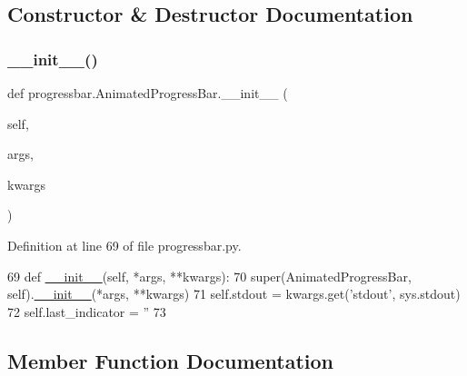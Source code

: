 \subsection{Constructor \& Destructor Documentation}
\mbox{\label{classprogressbar_1_1AnimatedProgressBar_ac5fb173f8610ea6caa27306a60a8903f}} 
\subsubsection{\texorpdfstring{\+\_\+\+\_\+init\+\_\+\+\_\+()}{\_\_init\_\_()}}
{\footnotesize\ttfamily def progressbar.\+Animated\+Progress\+Bar.\+\_\+\+\_\+init\+\_\+\+\_\+ (\begin{DoxyParamCaption}\item[{}]{self,  }\item[{}]{args,  }\item[{}]{kwargs }\end{DoxyParamCaption})}



Definition at line 69 of file progressbar.\+py.


\begin{DoxyCode}
69     \textcolor{keyword}{def }\hyperlink{classwrapper_1_1ModuleDictWrapper_a9a7a794150502f51df687831583e13b9}{\_\_init\_\_}(self, *args, **kwargs):
70         super(AnimatedProgressBar, self).\hyperlink{classwrapper_1_1ModuleDictWrapper_a9a7a794150502f51df687831583e13b9}{\_\_init\_\_}(*args, **kwargs)
71         self.stdout = kwargs.get(\textcolor{stringliteral}{'stdout'}, sys.stdout)
72         self.last\_indicator = \textcolor{stringliteral}{''}
73 
\end{DoxyCode}


\subsection{Member Function Documentation}
\mbox{\label{classprogressbar_1_1ProgressBar_ab72aa084f53baad02409c8e7e5979046}} 
